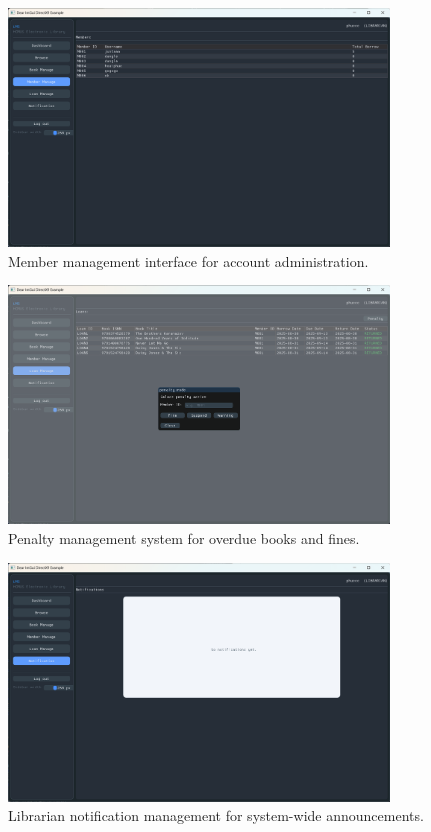 \begin{figure}[H]
	\centering
	\includegraphics[width=0.9\textwidth]{figures/screenshot_librarian_memmanage.png}
	\caption{Member management interface for account administration.}
	\label{fig:ss_librarian_memmanage}
\end{figure}

\begin{figure}[H]
	\centering
	\includegraphics[width=0.9\textwidth]{figures/screenshot_librarian_penalty.png}
	\caption{Penalty management system for overdue books and fines.}
	\label{fig:ss_librarian_penalty}
\end{figure}

\begin{figure}[H]
	\centering
	\includegraphics[width=0.9\textwidth]{figures/screenshot_librarian_noti.png}
	\caption{Librarian notification management for system-wide announcements.}
	\label{fig:ss_librarian_noti}
\end{figure}

